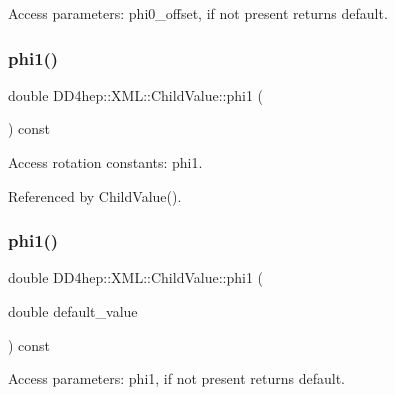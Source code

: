 Access parameters\+: phi0\+\_\+offset, if not present returns default. 

\hypertarget{struct_d_d4hep_1_1_x_m_l_1_1_child_value_a84f8dd789adc1b93e4e1db7b57ebdad3}{}\label{struct_d_d4hep_1_1_x_m_l_1_1_child_value_a84f8dd789adc1b93e4e1db7b57ebdad3} 
\subsubsection{\texorpdfstring{phi1()}{phi1()}\hspace{0.1cm}{\footnotesize\ttfamily [1/2]}}
{\footnotesize\ttfamily double D\+D4hep\+::\+X\+M\+L\+::\+Child\+Value\+::phi1 (\begin{DoxyParamCaption}{ }\end{DoxyParamCaption}) const}



Access rotation constants\+: phi1. 



Referenced by Child\+Value().

\hypertarget{struct_d_d4hep_1_1_x_m_l_1_1_child_value_a0cdd8daefd472f319ab214ac2f85534e}{}\label{struct_d_d4hep_1_1_x_m_l_1_1_child_value_a0cdd8daefd472f319ab214ac2f85534e} 
\subsubsection{\texorpdfstring{phi1()}{phi1()}\hspace{0.1cm}{\footnotesize\ttfamily [2/2]}}
{\footnotesize\ttfamily double D\+D4hep\+::\+X\+M\+L\+::\+Child\+Value\+::phi1 (\begin{DoxyParamCaption}\item[{double}]{default\+\_\+value }\end{DoxyParamCaption}) const}



Access parameters\+: phi1, if not present returns default. 

\hypertarget{struct_d_d4hep_1_1_x_m_l_1_1_child_value_a8ac7ccb1d78edffb482d72cd247b0c45}{}\label{struct_d_d4hep_1_1_x_m_l_1_1_child_value_a8ac7ccb1d78edffb482d72cd247b0c45} 

